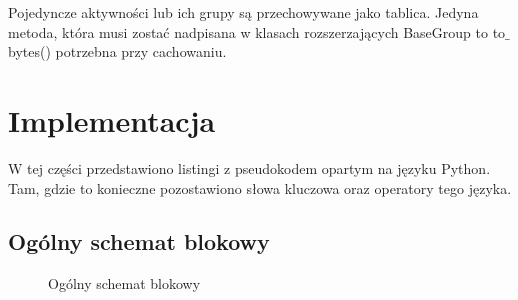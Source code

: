 Pojedyncze aktywności lub ich grupy są przechowywane jako tablica. Jedyna metoda, która musi zostać nadpisana w klasach rozszerzających BaseGroup to to$\_$bytes() potrzebna przy cachowaniu. 

\section{Implementacja}

W tej części przedstawiono listingi z pseudokodem opartym na języku Python. Tam, gdzie to konieczne pozostawiono słowa kluczowa oraz operatory tego języka.

\subsection{Ogólny schemat blokowy}


\begin{figure}[!ht]
	\caption{\label{fig:flow_chart}Ogólny schemat blokowy}
\end{figure}

